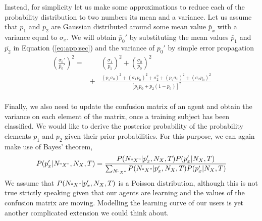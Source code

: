\documentclass[useAMS,usenatbib,a4paper]{mn2e}
\begin{document}
Instead, for simplicity let us make some approximations to reduce each of the
probability distribution to two numbers its mean and a variance. Let us assume
that $p_1$ and $p_2$ are Gaussian distributed around some mean value
$\bar{p}_x$ with a variance equal to $\sigma_x$. We will obtain $\bar{p}_0'$ by
substituting the mean values $\bar{p}_1$ and $\bar{p_2}$ in Equation
(\ref{eq:app:sec}) and the variance of $p_0'$ by simple error propagation
\begin{eqnarray}
\left(\frac{\sigma_0'}{\bar{p}_0'}\right)^2 =&& \left(\frac{\sigma_1}{p_1}\right)^2 + \left(\frac{\sigma_0}{p_0}\right)^2 \nonumber \\
&+& \frac{ (p_1\sigma_0)^2 + (\sigma_1p_0)^2 + \sigma_2^2 + (p_2\sigma_0)^2 + (\sigma_2p_0)^2}{ \left[ p_1 p_0 + p_2 (1- p_0)\right]^2 } \nonumber \\
\end{eqnarray}

Finally, we also need to update the confusion matrix of an agent and obtain the
variance on each element of the matrix, once a training subject has been
classified. We would like to derive the posterior probability of the
probability elements $p_1$ and $p_2$ given their prior probabilities. For this
purpose, we can again make use of Bayes' theorem,
\begin{equation}
P(p_x'|N_{"X"},N_X,T) = \frac{P(N_{``X"}|p_x',N_X,T) P(p_x'|N_X,T)}{\sum_{N_{``X"}} P(N_{``X"}|p_x',N_X,T) P(p_x'|N_X,T)}
\end{equation}
We assume that $P(N_{``X"}|p_x',N_X,T)$ is a Poisson distribution, although
this is not true strictly speaking given that our agents are learning and the
values of the confusion matrix are moving. Modelling the learning curve of our
users is yet another complicated extension we could think about.



% 






\label{lastpage}
\bsp
\end{document}

